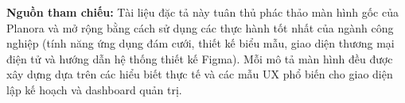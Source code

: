 \documentclass[11pt,a4paper]{article}
\begin{document}
\vspace{1cm}
\textbf{Nguồn tham chiếu:} Tài liệu đặc tả này tuân thủ phác thảo màn hình gốc của Planora và mở rộng bằng cách sử dụng các thực hành tốt nhất của ngành công nghiệp (tính năng ứng dụng đám cưới, thiết kế biểu mẫu, giao diện thương mại điện tử và hướng dẫn hệ thống thiết kế Figma). Mỗi mô tả màn hình đều được xây dựng dựa trên các hiểu biết thực tế và các mẫu UX phổ biến cho giao diện lập kế hoạch và dashboard quản trị.
\end{document}
